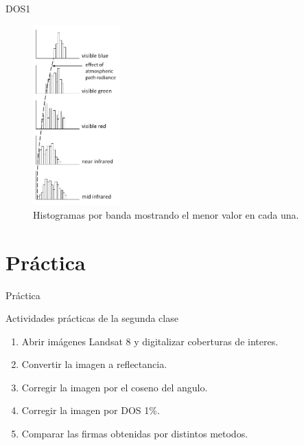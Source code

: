 \documentclass[]{beamer}
\begin{document}
\begin{frame}{DOS1}
  \begin{figure}
  \centering
  \includegraphics[width=0.30\textwidth]{imagenes/dos.png}
  \caption{Histogramas por banda mostrando el menor valor en cada una.}
  \end{figure}
\end{frame}


\section{Pr\'actica}

\begin{frame}{Pr\'actica}
  \begin{exampleblock}{Actividades pr\'acticas de la segunda clase}
    \begin{enumerate}
      \item Abrir im\'agenes Landsat 8 y digitalizar coberturas de interes.
      \item Convertir la imagen a reflectancia.
      \item Corregir la imagen por el coseno del angulo.
      \item Corregir la imagen por DOS 1\%.
      \item Comparar las firmas obtenidas por distintos metodos.
    \end{enumerate}
  \end{exampleblock}
\end{frame}
\end{document}

